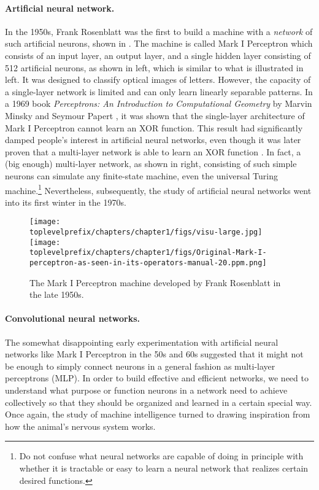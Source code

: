 \documentclass[../../book-main.tex]{subfiles}
\begin{document}
\paragraph{Artificial neural network.}
In the 1950s, Frank Rosenblatt was the first to build a machine with a {\em network} of such artificial neurons, shown in . The machine is called Mark I Perceptron which consists of an input layer, an output layer, and a single hidden layer consisting of 512 artificial neurons, as shown in  left, which is similar to what is illustrated in  left. It was designed to classify optical images of letters. However, the capacity of a single-layer network is limited and can only learn linearly separable patterns. In a 1969 book {\em Perceptrons: An Introduction to Computational Geometry} by Marvin Minsky and Seymour Papert \cite{Minsky-1969}, it was shown that the single-layer architecture of Mark I Perceptron cannot learn an XOR function. This result had significantly damped people's interest in artificial neural networks, even though it was later proven that a multi-layer network is able to learn an XOR function \cite{Rumelhart1986}. In fact, a (big enough) multi-layer network, as shown in  right, consisting of such simple neurons can simulate any finite-state machine, even the universal Turing machine.\footnote{Do not confuse what neural networks are capable of doing in principle with whether it is tractable or easy to learn a neural network that realizes certain desired functions.}  Nevertheless, subsequently, the study of artificial neural networks went into its first winter in the 1970s.

\begin{figure}
    \centering
    \texttt{[image: \\toplevelprefix/chapters/chapter1/figs/visu-large.jpg]}
    \hspace{2mm} \texttt{[image: \\toplevelprefix/chapters/chapter1/figs/Original-Mark-I-perceptron-as-seen-in-its-operators-manual-20.ppm.png]}
    \caption{The Mark I Perceptron machine developed by Frank Rosenblatt in the late 1950s.}
    \label{fig:perceptron}
\end{figure}


\paragraph{Convolutional neural networks.}
The somewhat disappointing early experimentation with artificial neural networks like Mark I Perceptron in the 50s and 60s suggested that it might not be enough to simply connect neurons in a general fashion as multi-layer perceptrons (MLP). In order to build effective and efficient networks, we need to understand what purpose or function neurons in a network need to achieve collectively so that they should be organized and learned in a certain special way. Once again, the study of machine intelligence turned to drawing inspiration from how the animal's nervous system works. 
\end{document}
